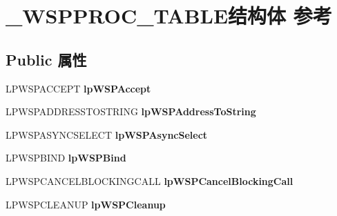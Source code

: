 \hypertarget{struct___w_s_p_p_r_o_c___t_a_b_l_e}{}\section{\+\_\+\+W\+S\+P\+P\+R\+O\+C\+\_\+\+T\+A\+B\+L\+E结构体 参考}
\label{struct___w_s_p_p_r_o_c___t_a_b_l_e}
\subsection*{Public 属性}
\begin{DoxyCompactItemize}
\item 
\mbox{\label{struct___w_s_p_p_r_o_c___t_a_b_l_e_ad60b3e0e574babc695df7333cdfd78c8}} 
L\+P\+W\+S\+P\+A\+C\+C\+E\+PT {\bfseries lp\+W\+S\+P\+Accept}
\item 
\mbox{\label{struct___w_s_p_p_r_o_c___t_a_b_l_e_aa9dc09115988f8820239074bb3049098}} 
L\+P\+W\+S\+P\+A\+D\+D\+R\+E\+S\+S\+T\+O\+S\+T\+R\+I\+NG {\bfseries lp\+W\+S\+P\+Address\+To\+String}
\item 
\mbox{\label{struct___w_s_p_p_r_o_c___t_a_b_l_e_af2e14318b9f864acd29afa227ee08e46}} 
L\+P\+W\+S\+P\+A\+S\+Y\+N\+C\+S\+E\+L\+E\+CT {\bfseries lp\+W\+S\+P\+Async\+Select}
\item 
\mbox{\label{struct___w_s_p_p_r_o_c___t_a_b_l_e_ada5f0a3f3c72b7507ab49f7f66c0efc2}} 
L\+P\+W\+S\+P\+B\+I\+ND {\bfseries lp\+W\+S\+P\+Bind}
\item 
\mbox{\label{struct___w_s_p_p_r_o_c___t_a_b_l_e_ae9159cf0899cabfce1c974818401b3ef}} 
L\+P\+W\+S\+P\+C\+A\+N\+C\+E\+L\+B\+L\+O\+C\+K\+I\+N\+G\+C\+A\+LL {\bfseries lp\+W\+S\+P\+Cancel\+Blocking\+Call}
\item 
\mbox{\label{struct___w_s_p_p_r_o_c___t_a_b_l_e_a9566276e8cf96de8b6e60debe2fd35e9}} 
L\+P\+W\+S\+P\+C\+L\+E\+A\+N\+UP {\bfseries lp\+W\+S\+P\+Cleanup}
\item 
\mbox{\label{struct___w_s_p_p_r_o_c___t_a_b_l_e_a31d72d1c77a904d129cf0c385a272ecf}} 

\end{DoxyCompactItemize}
